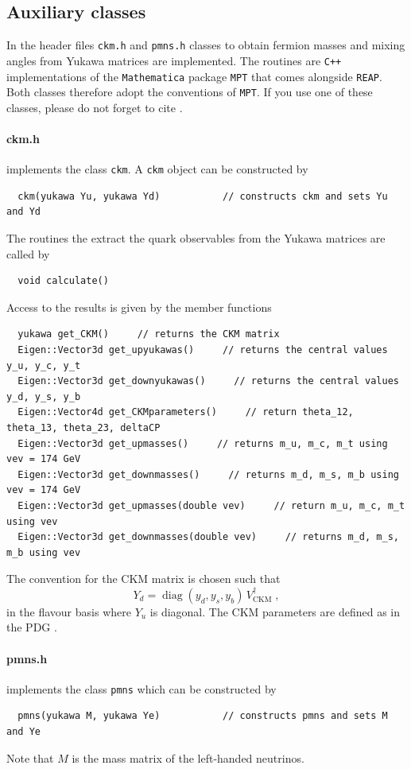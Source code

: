 \documentclass[11pt,a4paper]{article}
\begin{document}
\subsection{\label{sec::auxiliary} Auxiliary classes}
In the header files \texttt{ckm.h} and \texttt{pmns.h} classes to obtain fermion masses and mixing angles from Yukawa matrices are implemented. The routines are \texttt{C++} implementations of the \texttt{Mathematica} package \texttt{MPT} that comes alongside \texttt{REAP}. Both classes therefore adopt the conventions of \texttt{MPT}. If you use one of these classes, please do not forget to cite \cite{Antusch:2005gp}.
\paragraph{ckm.h}
implements the class \texttt{ckm}.
A \texttt{ckm} object can be constructed by
\begin{lstlisting}
  ckm(yukawa Yu, yukawa Yd)           // constructs ckm and sets Yu and Yd
\end{lstlisting}
The routines the extract the quark observables from the Yukawa matrices are called by
\begin{lstlisting}
  void calculate()
\end{lstlisting}
Access to the results is given by the member functions
\begin{lstlisting}
  yukawa get_CKM()     // returns the CKM matrix
  Eigen::Vector3d get_upyukawas()     // returns the central values y_u, y_c, y_t
  Eigen::Vector3d get_downyukawas()     // returns the central values y_d, y_s, y_b
  Eigen::Vector4d get_CKMparameters()     // return theta_12, theta_13, theta_23, deltaCP
  Eigen::Vector3d get_upmasses()     // returns m_u, m_c, m_t using vev = 174 GeV
  Eigen::Vector3d get_downmasses()     // returns m_d, m_s, m_b using vev = 174 GeV
  Eigen::Vector3d get_upmasses(double vev)     // return m_u, m_c, m_t using vev
  Eigen::Vector3d get_downmasses(double vev)     // returns m_d, m_s, m_b using vev
\end{lstlisting}
The convention for the CKM matrix is chosen such that
\begin{equation}
  Y_d = \operatorname{diag}(y_d,y_s,y_b)\, V_{\mathrm{CKM}}^\dagger\;,
\end{equation}
in the flavour basis where $Y_u$ is diagonal. The CKM parameters are defined as in the PDG \cite{Patrignani:2016xqp}.

\paragraph{pmns.h}
implements the class \texttt{pmns} which can be constructed by
\begin{lstlisting}
  pmns(yukawa M, yukawa Ye)           // constructs pmns and sets M and Ye
\end{lstlisting}
Note that $M$ is the mass matrix of the left-handed neutrinos.
\end{document}
